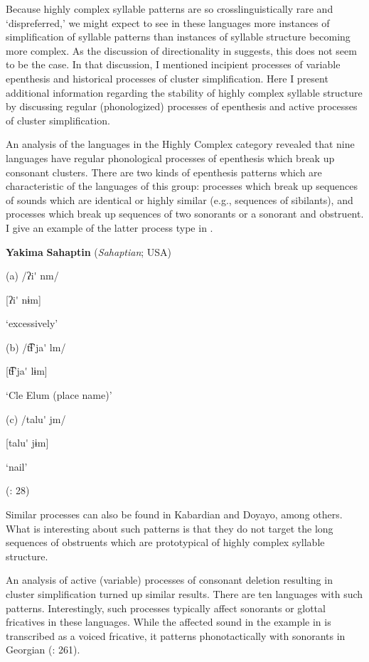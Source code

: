   Because highly complex syllable patterns are so crosslinguistically rare and ‘dispreferred,’ we might expect to see in these languages more instances of simplification of syllable patterns than instances of syllable structure becoming more complex. As the discussion of directionality in  suggests, this does not seem to be the case. In that discussion, I mentioned incipient processes of variable epenthesis and historical processes of cluster simplification. Here I present additional information regarding the stability of highly complex syllable structure by discussing regular (phonologized) processes of epenthesis and active processes of cluster simplification.

  An analysis of the languages in the Highly Complex category revealed that nine languages have regular phonological processes of epenthesis which break up consonant clusters. There are two kinds of epenthesis patterns which are characteristic of the languages of this group: processes which break up sequences of sounds which are identical or highly similar (e.g., sequences of sibilants), and processes which break up sequences of two sonorants or a sonorant and obstruent. I give an example of the latter process type in .

\ea\label{ex:(8.7)}
  \textbf{Yakima} \textbf{Sahaptin} (\textit{Sahaptian}; USA)

(a)  /ʔi\'{} nm/

  [ʔi\'{} nɨm]

  ‘excessively’

(b)  /t͡ɬ’ja\'{} lm/

  [t͡ɬ’ja\'{} lɨm]

  ‘Cle Elum (place name)’

(c)  /talu\'{} jm/

  [talu\'{} jɨm]

  ‘nail’

(\citealt{HargusBeavert2006}: 28)
\z

Similar processes can also be found in Kabardian and Doyayo, among others. What is interesting about such patterns is that they do not target the long sequences of obstruents which are prototypical of highly complex syllable structure.

  An analysis of active (variable) processes of consonant deletion resulting in cluster simplification turned up similar results. There are ten languages with such patterns. Interestingly, such processes typically affect sonorants or glottal fricatives in these languages. While the affected sound in the example in  is transcribed as a voiced fricative, it patterns phonotactically with sonorants in Georgian (\citealt{ShostedChikovani2006}: 261).

